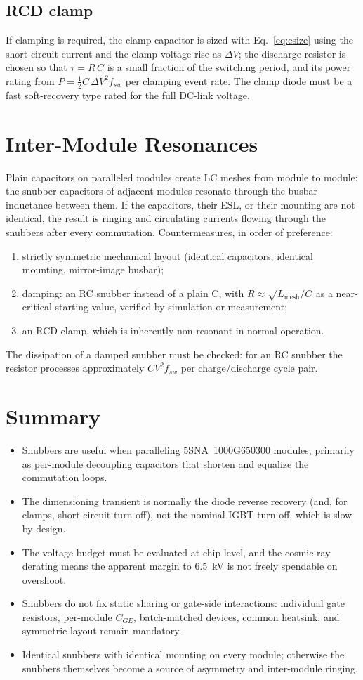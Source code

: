 \documentclass[11pt,a4paper]{article}
\begin{document}
\subsection{RCD clamp}
If clamping is required, the clamp capacitor is sized with Eq.~\eqref{eq:csize} using
the short-circuit current and the clamp voltage rise as $\Delta V$; the discharge
resistor is chosen so that $\tau = R\,C$ is a small fraction of the switching period,
and its power rating from $P = \tfrac{1}{2} C \,\Delta V^2 f_{sw}$ per clamping event
rate. The clamp diode must be a fast soft-recovery type rated for the full DC-link
voltage.

\section{Inter-Module Resonances}
Plain capacitors on paralleled modules create LC meshes from module to module: the
snubber capacitors of adjacent modules resonate through the busbar inductance between
them. If the capacitors, their ESL, or their mounting are not identical, the result is
ringing and circulating currents flowing through the snubbers after every commutation.
Countermeasures, in order of preference:
\begin{enumerate}
\item strictly symmetric mechanical layout (identical capacitors, identical mounting,
mirror-image busbar);
\item damping: an RC snubber instead of a plain C, with
$R \approx \sqrt{L_{\mathrm{mesh}}/C}$ as a near-critical starting value, verified by
simulation or measurement;
\item an RCD clamp, which is inherently non-resonant in normal operation.
\end{enumerate}
The dissipation of a damped snubber must be checked: for an RC snubber the resistor
processes approximately $C V^2 f_{sw}$ per charge/discharge cycle pair.

\section{Summary}
\begin{itemize}
\item Snubbers are useful when paralleling 5SNA~1000G650300 modules, primarily as
per-module decoupling capacitors that shorten and equalize the commutation loops.
\item The dimensioning transient is normally the diode reverse recovery (and, for
clamps, short-circuit turn-off), not the nominal IGBT turn-off, which is slow by
design.
\item The voltage budget must be evaluated at chip level, and the cosmic-ray derating
means the apparent margin to \SI{6.5}{kV} is not freely spendable on overshoot.
\item Snubbers do not fix static sharing or gate-side interactions: individual gate
resistors, per-module $C_{GE}$, batch-matched devices, common heatsink, and symmetric
layout remain mandatory.
\item Identical snubbers with identical mounting on every module; otherwise the
snubbers themselves become a source of asymmetry and inter-module ringing.
\end{itemize}
\end{document}
